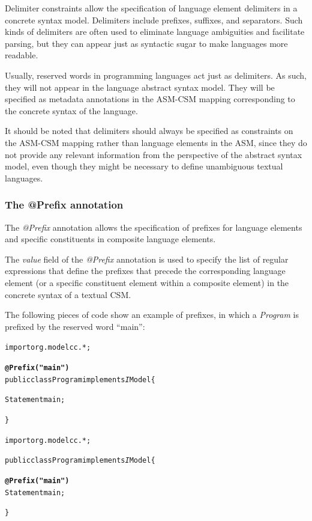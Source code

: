 \documentclass[a4paper,twoside,onecolumn]{article}
\newenvironment{colframe}{%
  \begin{Sbox} 
    \begin{minipage}{.8\columnwidth} 
}{%

  \end{minipage} 
  \end{Sbox} 
  \begin{center} 
    \fcolorbox{black}{MyGray}{\TheSbox} 
  \end{center} 
}
\newcommand{\an}[1]{\emph{#1}} %
\begin{document}
Delimiter constraints allow the specification of language element delimiters in a concrete syntax model. Delimiters include prefixes, suffixes,
and separators. Such kinds of delimiters are often used to eliminate language ambiguities and facilitate parsing, but they can appear just as
syntactic sugar to make languages more readable.

Usually, reserved words in programming languages act just as delimiters. As such, they will not appear in the language abstract syntax model.
They will be specified as metadata annotations in the ASM-CSM mapping corresponding to the concrete syntax of the language.

It should be noted that delimiters should always be specified as constraints on the ASM-CSM mapping rather than language elements in the ASM,
since they do not provide any relevant information from the perspective of the abstract syntax model, even though they might be necessary to
define unambiguous textual languages.

\subsubsection{The @Prefix annotation}

The \an{@Prefix} annotation allows the specification of prefixes for language elements and specific constituents in composite language elements.

The \emph{value} field of the \an{@Prefix} annotation is used to specify the list of regular expressions that define the prefixes that precede
the corresponding language element (or a specific constituent element within a composite element) in the concrete syntax of a textual CSM.

The following pieces of code show an example of prefixes, in which a \emph{Program} is prefixed by the reserved word ``main'':

\begin{colframe}
\begin{alltt}
import org.modelcc.*;

{\bf\unskip @Prefix("main")}
public class Program implements{\emph IModel} \{

  Statement main;

\}
\end{alltt}
\end{colframe}

\begin{colframe}
\begin{alltt}
import org.modelcc.*;

public class Program implements{\emph IModel} \{

  {\bf\unskip @Prefix("main")}
  Statement main;

\}
\end{alltt}
\end{colframe}
\end{document}
